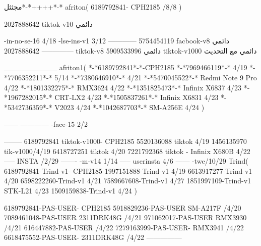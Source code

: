 مجثثل*-*++++*-*
afriton(
6189792841- CPH2185  /8/8
)

2027888642 tiktok-v10
دائمي

-in-no-se-16 4/18
-lse-ins-v1 3/12
------------
5754454119 facbook-v8
دائمي
--------------
2027888642 tiktok-v8
دائمي
5909533996 tiktok-v1000
دائمي مع التحديث

__________
afriton1(
*-*6189792841*-*-CPH2185
*-*7969466119*-* 4/19
*-*7706352211*-* 5/14
*-*7380646910*-* 4/21
*-*5470045522*-* Redmi Note 9 Pro 4/22
*-*1801332275*-* RMX3624 4/22
*-*1351825473*-* Infinix X6837 4/23
*-*1967282015*-* CRT-LX2 4/23
*-*1505837261*-* Infinix X6831 4/23
*-*5342736359*-* V2023 4/24
*-*1042687703*-* SM-A256E 4/24
)


------
------------
-face-15 2/2

--------
6189792841 tiktok-v1000- CPH2185 
5520136088 tiktok 4/19
1456135970 tik-v1000/4/19
6418727251 tiktok 4/20
7221792368 tiktok - Infinix X680B  4/22 
-----
 INSTA /2/29
-------
-m-v14 1/14
-----
userinsta 4/6
------
-twe/10/29
Trind(
6189792841-Trind-v1- CPH2185 
1997151888-Trind-v1  4/19
6613917277-Trind-v1  4/20
6598222260-Trind-v1  4/21
7589667608-Trind-v1  4/27
1851997109-Trind-v1 STK-L21 4/23
1509159838-Trind-v1  4/24
)

6189792841-PAS-USER- CPH2185 
5918829236-PAS-USER SM-A217F /4/20
7089461048-PAS-USER 2311DRK48G /4/21
971062017-PAS-USER RMX3930 /4/21
616447882-PAS-USER /4/22
7279163999-PAS-USER- RMX3941 /4/22
6618475552-PAS-USER- 2311DRK48G /4/22
    ---------------
